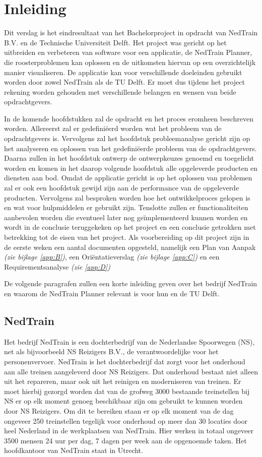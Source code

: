 \section{Inleiding}
Dit verslag is het eindresultaat van het Bachelorproject in opdracht van NedTrain B.V. en de Technische Universiteit Delft. Het project was gericht op het uitbreiden en verbeteren van software voor een applicatie, de NedTrain Planner, die roosterproblemen kan oplossen en de uitkomsten hiervan op een overzichtelijk manier visualiseren. De applicatie kan voor verschillende doeleinden gebruikt worden door zowel NedTrain als de TU Delft. Er moet dus tijdens het project rekening worden gehouden met verschillende belangen en wensen van beide opdrachtgevers.

In de komende hoofdstukken zal de opdracht en het proces eromheen beschreven worden. Allereerst zal er gedefini\"eerd worden wat het probleem van de opdrachtgevers is. Vervolgens zal het hoofdstuk probleemanalyse gericht zijn op het analyseren en oplossen van het gedefini\"eerde probleem van de opdrachtgevers. Daarna zullen in het hoofdstuk ontwerp de ontwerpkeuzes genoemd en toegelicht worden en komen in het daarop volgende hoofdstuk alle opgeleverde producten en diensten aan bod. Omdat de applicatie gericht is op het oplossen van problemen zal er ook een hoofdstuk gewijd zijn aan de performance van de opgeleverde producten. Vervolgens zal besproken worden hoe het ontwikkelproces gelopen is en wat voor hulpmiddelen er gebruikt zijn. Tenslotte zullen er functionaliteiten aanbevolen worden die eventueel later nog ge\"implementeerd kunnen worden en wordt in de conclusie teruggekeken op het project en een conclusie getrokken met betrekking tot de eisen van het project. Als voorbereiding op dit project zijn in de eerste weken een aantal documenten opgesteld, namelijk een Plan van Aanpak \emph{(zie bijlage \ref{app:B})}, een Ori\"entatieverslag \emph{(zie bijlage \ref{app:C})} en een Requirementsanalyse \emph{(zie \ref{app:D})}

De volgende paragrafen zullen een korte inleiding geven over het bedrijf NedTrain en waarom de NedTrain Planner relevant is voor hun en de TU Delft.

\subsection{NedTrain}
Het bedrijf NedTrain is een dochterbedrijf van de Nederlandse Spoorwegen (NS), net als bijvoorbeeld NS Reizigers B.V., de verantwoordelijke voor het personenvervoer. NedTrain is het dochterbedrijf dat zorgt voor het onderhoud aan alle treinen aangeleverd door NS Reizigers. Dat onderhoud bestaat niet alleen uit het repareren, maar ook uit het reinigen en moderniseren van treinen. Er moet hierbij gezorgd worden dat van de grofweg 3000 bestaande treinstellen bij NS er op elk moment genoeg beschikbaar zijn om gebruikt te kunnen worden door NS Reizigers. Om dit te bereiken staan er op elk moment van de dag ongeveer 250 treinstellen tegelijk voor onderhoud op meer dan 30 locaties door heel Nederland in de werkplaatsen van NedTrain. Hier werken in totaal ongeveer 3500 mensen 24 uur per dag, 7 dagen per week aan de opgenoemde taken. Het hoofdkantoor van NedTrain staat in Utrecht.

